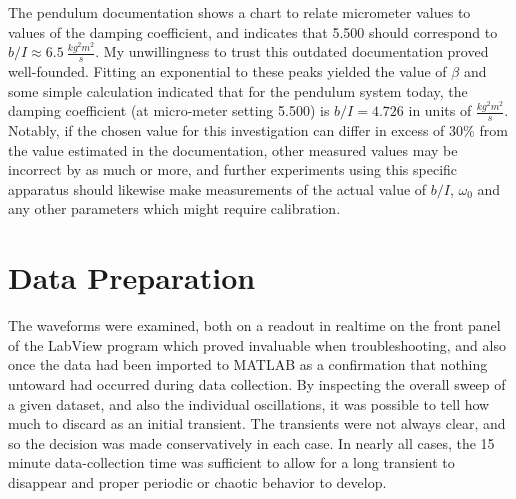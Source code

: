 \documentclass[12pt,twoside]{reedthesis}
\begin{document}
The pendulum documentation shows a chart to relate micrometer values to values of the damping coefficient, and indicates that 5.500 should correspond to $b/I \approx 6.5 ~ \frac{kg^2 m^2}{s}$.  My unwillingness to trust this outdated documentation proved well-founded.  
Fitting an exponential to these peaks yielded the value of $\beta$ and some simple calculation indicated that for the pendulum system today, the damping coefficient (at micro-meter setting 5.500) is $b/I = 4.726$ in units of $\frac{kg^2 m^2}{s}$.  
	Notably, if the chosen value for this investigation can differ in excess of 30\% from the value estimated in the documentation, other measured values may be incorrect by as much or more, and further experiments using this specific apparatus should likewise make measurements of the actual value of $b/I$, $\omega_0$ and any other parameters which might require calibration.  

\section{Data Preparation}
\label{prep}

The waveforms were examined, both on a readout in realtime on the front panel of the LabView program which proved invaluable when troubleshooting, and also once the data had been imported to MATLAB as a confirmation that nothing untoward had occurred during data collection.  By inspecting the overall sweep of a given dataset, and also the individual oscillations, it was possible to tell how much to discard as an initial transient.  The transients were not always clear, and so the decision was made conservatively in each case.  In nearly all cases, the 15 minute data-collection time was sufficient to allow for a long transient to disappear and proper periodic or chaotic behavior to develop. 
\end{document}
